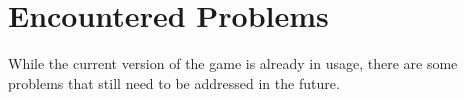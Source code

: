 \documentclass[draft,final]{vutinfth} %
\begin{document}
\begin{comment}
Last but not least, some scripts were used globally and thus persist in multiple scenarios:
\begin{itemize}
\item \textbf{GoToScene}: Adds a visual transition component when switching scenes.
\item \textbf{LinkHandlerForTMPText}: Allows embedding hyperlinks within texts in the game.
\item \textbf{QuitGame}: Exits the game.
\item \textbf{TempData}: A static class which is used to store state-data while playing the game. It is used to correctly display available levels or to load correct level files. This class is newly initialized whenever the game is opened, meaning it cannot be used to store persistent data.
\item \textbf{ToggleButtonImage}: Allows images for buttons to be easily replaced when pressing them.
\end{itemize}

\begin{figure}
  \centering
  \texttt{[image: LE\_Scripts]}
  \caption{Script Structure of the game.}
\end{figure}
\end{comment}

\section{Encountered Problems}
While the current version of the game is already in usage, there are some problems that still need to be addressed in the future. 
\end{document}
